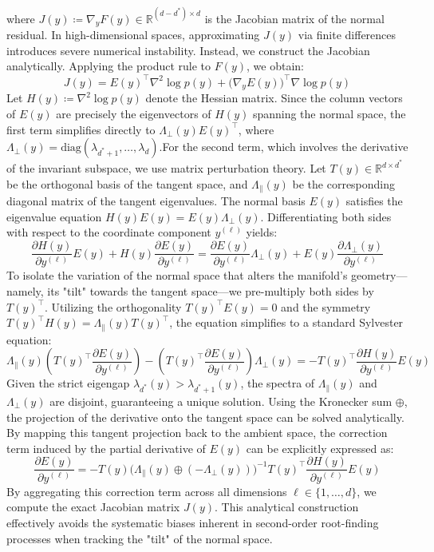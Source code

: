\documentclass[11pt]{article}
\begin{document}
where $J(y) \coloneqq \nabla_y F(y) \in \mathbb{R}^{(d-d^*) \times d}$ is the Jacobian matrix of the normal residual. In high-dimensional spaces, approximating $J(y)$ via finite differences introduces severe numerical instability. Instead, we construct the Jacobian analytically. Applying the product rule to $F(y)$, we obtain:\begin{equation}J(y) = E(y)^\intercal \nabla^2 \log p(y) + \big(\nabla_y E(y)\big)^\intercal \nabla \log p(y)\end{equation}Let $H(y) \coloneqq \nabla^2 \log p(y)$ denote the Hessian matrix. Since the column vectors of $E(y)$ are precisely the eigenvectors of $H(y)$ spanning the normal space, the first term simplifies directly to $\Lambda_{\perp}(y) E(y)^\intercal$, where $\Lambda_{\perp}(y) = \text{diag}(\lambda_{d^*+1}, \dots, \lambda_d)$.For the second term, which involves the derivative of the invariant subspace, we use matrix perturbation theory. Let $T(y) \in \mathbb{R}^{d \times d^*}$ be the orthogonal basis of the tangent space, and $\Lambda_{\parallel}(y)$ be the corresponding diagonal matrix of the tangent eigenvalues. The normal basis $E(y)$ satisfies the eigenvalue equation $H(y) E(y) = E(y) \Lambda_{\perp}(y)$. Differentiating both sides with respect to the coordinate component $y^{(\ell)}$ yields:$$\frac{\partial H(y)}{\partial y^{(\ell)}} E(y) + H(y) \frac{\partial E(y)}{\partial y^{(\ell)}} = \frac{\partial E(y)}{\partial y^{(\ell)}} \Lambda_{\perp}(y) + E(y) \frac{\partial \Lambda_{\perp}(y)}{\partial y^{(\ell)}}$$To isolate the variation of the normal space that alters the manifold's geometry—namely, its "tilt" towards the tangent space—we pre-multiply both sides by $T(y)^\intercal$. Utilizing the orthogonality $T(y)^\intercal E(y) = 0$ and the symmetry $T(y)^\intercal H(y) = \Lambda_{\parallel}(y) T(y)^\intercal$, the equation simplifies to a standard Sylvester equation:$$\Lambda_{\parallel}(y) \left( T(y)^\intercal \frac{\partial E(y)}{\partial y^{(\ell)}} \right) - \left( T(y)^\intercal \frac{\partial E(y)}{\partial y^{(\ell)}} \right) \Lambda_{\perp}(y) = - T(y)^\intercal \frac{\partial H(y)}{\partial y^{(\ell)}} E(y)$$Given the strict eigengap $\lambda_{d^*}(y) > \lambda_{d^*+1}(y)$, the spectra of $\Lambda_{\parallel}(y)$ and $\Lambda_{\perp}(y)$ are disjoint, guaranteeing a unique solution. Using the Kronecker sum $\oplus$, the projection of the derivative onto the tangent space can be solved analytically. By mapping this tangent projection back to the ambient space, the correction term induced by the partial derivative of $E(y)$ can be explicitly expressed as:$$\frac{\partial E(y)}{\partial y^{(\ell)}} = - T(y) \big(\Lambda_{\parallel}(y) \oplus (-\Lambda_{\perp}(y))\big)^{-1} T(y)^\intercal \frac{\partial H(y)}{\partial y^{(\ell)}} E(y)$$By aggregating this correction term across all dimensions $\ell \in \{1,\dots,d\}$, we compute the exact Jacobian matrix $J(y)$. This analytical construction effectively avoids the systematic biases inherent in second-order root-finding processes when tracking the "tilt" of the normal space.
\end{document}
